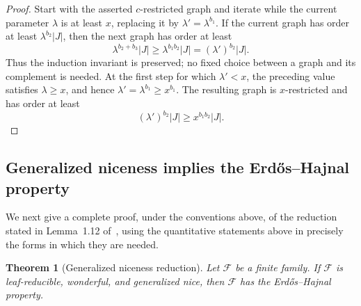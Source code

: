 \documentclass[11pt]{article}
\numberwithin{equation}{section}
\theoremstyle{plain}
\newtheorem{theorem}{Theorem}[section]
\theoremstyle{definition}
\begin{document}
\begin{proof}
Start with the asserted $c$-restricted graph and iterate while the
current parameter $\lambda$ is at least $x$, replacing it by
$\lambda'=\lambda^{b_1}$.  If the current graph has order at least
$\lambda^{b_2}|J|$, then the next graph has order at least
\[
 \lambda^{b_2+b_3}|J|
     \geq\lambda^{b_1b_2}|J|
     =(\lambda')^{b_2}|J|.
\]
Thus the induction invariant is preserved; no fixed choice between a
graph and its complement is needed.  At the first step for which
$\lambda'<x$, the preceding value satisfies $\lambda\geq x$, and hence
$\lambda'=\lambda^{b_1}\geq x^{b_1}$.  The resulting graph is
$x$-restricted and has order at least
\[
               (\lambda')^{b_2}|J|
                    \geq x^{b_1b_2}|J|.
\]
\end{proof}

\subsection{Generalized niceness implies the
Erd\H{o}s--Hajnal property}

We next give a complete proof, under the conventions above, of the
reduction stated in Lemma~1.12 of~\cite{HuangJuZhou2026}, using the
quantitative statements above in precisely the forms in which they are
needed.

\begin{theorem}[Generalized niceness reduction]
\label{thm:hjz-generalized-nice}
Let $\mathcal F$ be a finite family.  If $\mathcal F$ is
leaf-reducible, wonderful, and generalized nice, then $\mathcal F$
has the Erd\H{o}s--Hajnal property.
\end{theorem}
\end{document}

